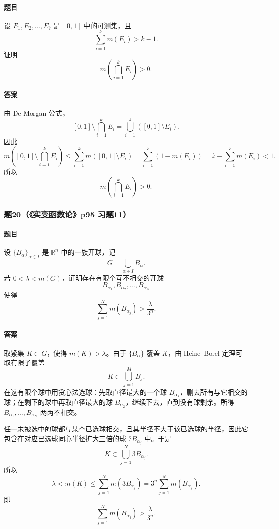 \documentclass{article}
\newcommand{\R}{\mathbb{R}}
\newcommand{\meas}{m}
\begin{document}
	\paragraph{题目}设 $E_1,E_2,\ldots,E_k$ 是 $[0,1]$ 中的可测集，且
	\[
	\sum_{i=1}^{k}\meas(E_i)>k-1.
	\]
	证明
	\[
	\meas\left(\bigcap_{i=1}^{k}E_i\right)>0.
	\]
	
	\paragraph{答案}由 De Morgan 公式，
	\[
	[0,1]\setminus\bigcap_{i=1}^{k}E_i
	=\bigcup_{i=1}^{k}([0,1]\setminus E_i).
	\]
	因此
	\[
	\meas\left([0,1]\setminus\bigcap_{i=1}^{k}E_i\right)
	\le \sum_{i=1}^{k}\meas([0,1]\setminus E_i)
	=\sum_{i=1}^{k}(1-\meas(E_i))
	=k-\sum_{i=1}^{k}\meas(E_i)<1.
	\]
	所以
	\[
	\meas\left(\bigcap_{i=1}^{k}E_i\right)>0.
	\]
	
	\subsubsection*{题20（《实变函数论》p95 习题11）}
	\paragraph{题目}设 $\{B_\alpha\}_{\alpha\in I}$ 是 $\R^n$ 中的一族开球，记
	\[
	G=\bigcup_{\alpha\in I}B_\alpha.
	\]
	若 $0<\lambda<\meas(G)$，证明存在有限个互不相交的开球
	\[
	B_{\alpha_1},B_{\alpha_2},\ldots,B_{\alpha_N}
	\]
	使得
	\[
	\sum_{j=1}^{N}\meas(B_{\alpha_j})>\frac{\lambda}{3^n}.
	\]
	
	\paragraph{答案}取紧集 $K\subset G$，使得 $\meas(K)>\lambda$。由于 $\{B_\alpha\}$ 覆盖 $K$，由 Heine--Borel 定理可取有限子覆盖
	\[
	K\subset\bigcup_{j=1}^{M}B_j.
	\]
	在这有限个球中用贪心法选球：先取直径最大的一个球 $B_{\alpha_1}$，删去所有与它相交的球；在剩下的球中再取直径最大的球 $B_{\alpha_2}$，继续下去，直到没有球剩余。所得 $B_{\alpha_1},\ldots,B_{\alpha_N}$ 两两不相交。
	
	任一未被选中的球都与某个已选球相交，且其半径不大于该已选球的半径，因此它包含在对应已选球同心半径扩大三倍的球 $3B_{\alpha_j}$ 中。于是
	\[
	K\subset\bigcup_{j=1}^{N}3B_{\alpha_j}.
	\]
	所以
	\[
	\lambda<\meas(K)
	\le \sum_{j=1}^{N}\meas(3B_{\alpha_j})
	=3^n\sum_{j=1}^{N}\meas(B_{\alpha_j}).
	\]
	即
	\[
	\sum_{j=1}^{N}\meas(B_{\alpha_j})>\frac{\lambda}{3^n}.
	\]
	
\end{document}

